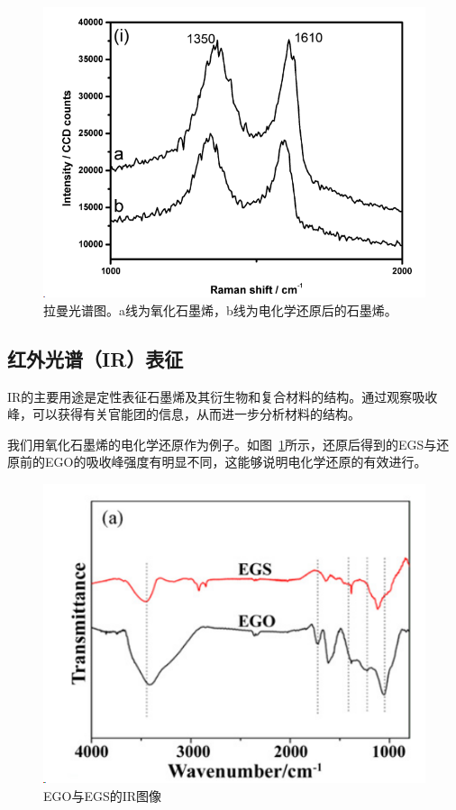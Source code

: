 \begin{figure}
    \centering
    \includegraphics[scale=0.4]{img/Raman}
    \caption{拉曼光谱图。a线为氧化石墨烯，b线为电化学还原后的石墨烯。}
\end{figure}


\subsection{红外光谱（IR）表征}

IR的主要用途是定性表征石墨烯及其衍生物和复合材料的结构。通过观察吸收峰，可以获得有关官能团的信息，从而进一步分析材料的结构。

我们用氧化石墨烯的电化学还原作为例子。如图~\ref{fig:IR}所示，还原后得到的EGS与还原前的EGO的吸收峰强度有明显不同，这能够说明电化学还原的有效进行\cite{RN32}。

\begin{figure}
    \centering
    \includegraphics[scale=0.4]{img/IR}
    \caption{EGO与EGS的IR图像}
    \label{fig:IR}
\end{figure}



